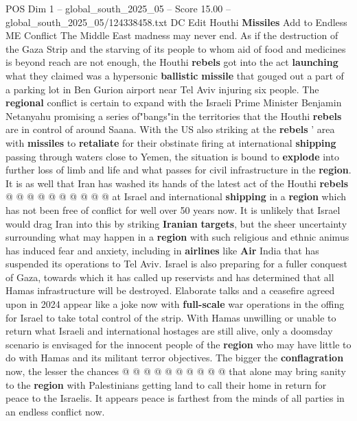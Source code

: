 \begin{textsample}{POS Dim 1 – global\_south\_2025\_05 – Score 15.00 – global\_south\_2025\_05/124338458.txt}  \label{ex:f1_pos_285}
DC Edit Houthi \textbf{Missiles} Add to Endless ME Conflict The Middle East madness may never end.
As if the destruction of the Gaza Strip and the starving of its people to whom aid of food and medicines is beyond reach are not enough, the Houthi \textbf{rebels} got into the act \textbf{launching} what they claimed was a hypersonic \textbf{ballistic} \textbf{missile} that gouged out a part of a parking lot in Ben Gurion airport near Tel Aviv injuring six people.
The \textbf{regional} conflict is certain to expand with the Israeli Prime Minister Benjamin Netanyahu promising a series of"bangs"in the territories that the Houthi \textbf{rebels} are in control of around Saana.
With the US also striking at the \textbf{rebels} ' area with \textbf{missiles} to \textbf{retaliate} for their obstinate firing at international \textbf{shipping} passing through waters close to Yemen, the situation is bound to \textbf{explode} into further loss of limb and life and what passes for civil infrastructure in the \textbf{region}.
It is as well that Iran has washed its hands of the latest act of the Houthi \textbf{rebels} @ @ @ @ @ @ @ @ @ @ at Israel and international \textbf{shipping} in a \textbf{region} which has not been free of conflict for well over 50 years now.
It is unlikely that Israel would drag Iran into this by striking \textbf{Iranian} \textbf{targets}, but the sheer uncertainty surrounding what may happen in a \textbf{region} with such religious and ethnic animus has induced fear and anxiety, including in \textbf{airlines} like \textbf{Air} India that has suspended its operations to Tel Aviv.
Israel is also preparing for a fuller conquest of Gaza, towards which it has called up reservists and has determined that all Hamas infrastructure will be destroyed.
Elaborate talks and a ceasefire agreed upon in 2024 appear like a joke now with \textbf{full-scale} war operations in the offing for Israel to take total control of the strip.
With Hamas unwilling or unable to return what Israeli and international hostages are still alive, only a doomsday scenario is envisaged for the innocent people of the \textbf{region} who may have little to do with Hamas and its militant terror objectives.
The bigger the \textbf{conflagration} now, the lesser the chances @ @ @ @ @ @ @ @ @ @ that alone may bring sanity to the \textbf{region} with Palestinians getting land to call their home in return for peace to the Israelis.
It appears peace is farthest from the minds of all parties in an endless conflict now.

\end{textsample}
